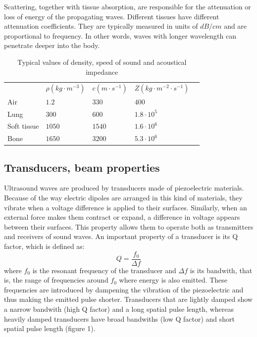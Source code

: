 \documentclass[12pt]{article} %
\begin{document}
	
	Scattering, together with tissue absorption, are responsible for the attenuation or loss of energy of the propagating waves. Different tissues have different attenuation coefficients. They are typically measured in units of $dB/cm$ and are proportional to frequency. In other words, waves with longer wavelength can penetrate deeper into the body. \cite{bushberg}

\begin{table}[]
\centering
\begin{tabular}{l|l|l|l|l}
            & $  \rho (kg  \cdot m^{-3})$ & $c (m \cdot s^{-1})$ & $Z (kg \cdot m^{-2} \cdot s^{-1})$ &  \\ \cline{1-4}
Air         & $1.2$                       & $330$                & $400$                              &  \\
Lung        & $300$                       & $600$                & $1.8 \cdot 10^5$                   &  \\
Soft tissue & $1050$                      & $1540$               & $1.6 \cdot 10^6$                   &  \\
Bone        & $1650$                      & $3200$               & $5.3 \cdot 10^6$                   & 
\end{tabular}
\caption{Typical values of density, speed of sound and acoustical impedance \cite{farr}}
\end{table}


\subsection{Transducers, beam properties}


	Ultrasound waves are produced by transducers made of piezoelectric materials. Because of the way electric dipoles are arranged in this kind of materials, they vibrate when a voltage difference is applied to their surfaces. Similarly, when an external force makes them contract or expand, a difference in voltage appears between their surfaces. This property allows them to operate both as transmitters and receivers of sound waves. An important property of a transducer is its Q factor, which is defined as: \[ Q = \frac{f_0}{\Delta f} \] where $f_0$ is the resonant frequency of the transducer and $ \Delta f$ is its bandwith, that is, the range of frequencies around $f_0$ where energy is also emitted. These frequencies are introduced by dampening the vibration of the piezoelectric and thus making the emitted pulse shorter. Transducers that are lightly damped show a  narrow bandwith (high Q factor) and a long spatial pulse length, whereas heavily damped transducers have broad bandwiths (low Q factor) and short spatial pulse length (figure 1). 
\end{document}
